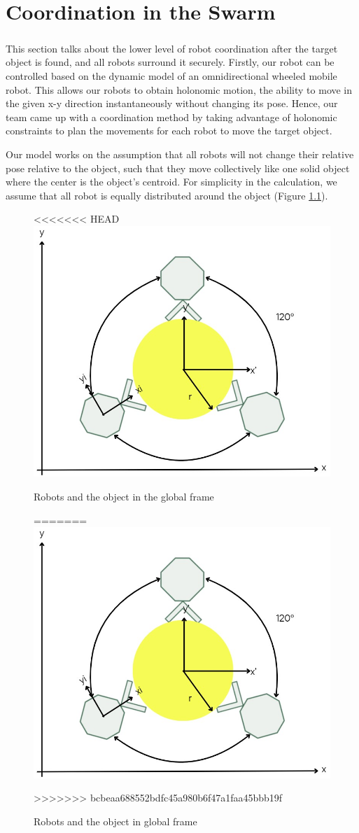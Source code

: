 \chapter{Coordination in the Swarm}

\paragraph*{}
This section talks about the lower level of robot coordination after the target object is found, and all robots surround it securely. Firstly, our robot can be controlled based on the dynamic model of an omnidirectional wheeled mobile robot. This allows our robots to obtain holonomic motion, the ability to move in the given x-y direction instantaneously without changing its pose. Hence, our team came up with a coordination method by taking advantage of holonomic constraints to plan the movements for each robot to move the target object.

Our model works on the assumption that all robots will not change their relative pose relative to the object, such that they move collectively like one solid object where the center is the object's centroid. For simplicity in the calculation, we assume that all robot is equally distributed around the object (Figure \ref{fig:coordination-diagram}).

\begin{figure} [H]
    \centering
<<<<<<< HEAD
    \includegraphics[width=0.5\linewidth]{assets/images/coordination/robots_with_object.jpg}
    \caption{Robots and the object in the global frame}
=======
    \includegraphics[width=0.3\linewidth]{assets/images/coordination/robots_with_object.jpg}
    \caption{Robots and the object in global frame}
>>>>>>> bcbeaa688552bdfc45a980b6f47a1faa45bbb19f
    \label{fig:coordination-diagram}
\end{figure}


